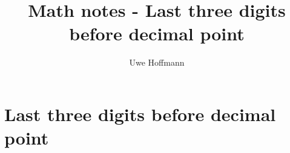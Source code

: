 

\title{Math notes - Last three digits before decimal point}
\author{Uwe Hoffmann}



\setcounter{chapter}{1}
\chapter*{Last three digits before decimal point}
